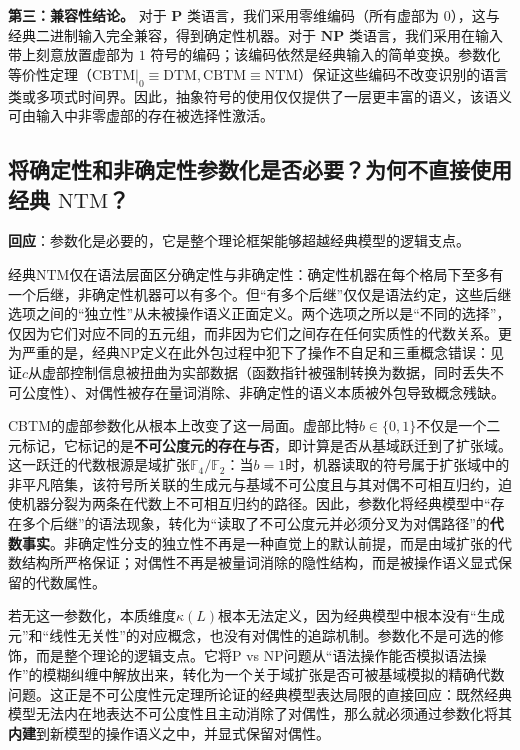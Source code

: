 \documentclass{ctexart}
\begin{document}
	\noindent\textbf{第三：兼容性结论。} 对于 $\mathbf{P}$ 类语言，我们采用零维编码（所有虚部为 $0$），这与经典二进制输入完全兼容，得到确定性机器。对于 $\mathbf{NP}$ 类语言，我们采用在输入带上刻意放置虚部为 $1$ 符号的编码；该编码依然是经典输入的简单变换。参数化等价性定理（$\text{CBTM}|_0 \equiv \text{DTM}, \text{CBTM} \equiv \text{NTM}$）保证这些编码不改变识别的语言类或多项式时间界。因此，抽象符号的使用仅仅提供了一层更丰富的语义，该语义可由输入中非零虚部的存在被选择性激活。
	
	
	\subsection{将确定性和非确定性参数化是否必要？为何不直接使用经典 $\mathrm{NTM}$？}
	
	\textbf{回应}：参数化是必要的，它是整个理论框架能够超越经典模型的逻辑支点。
	
	经典$\mathrm{NTM}$仅在语法层面区分确定性与非确定性：确定性机器在每个格局下至多有一个后继，非确定性机器可以有多个。但``有多个后继''仅仅是语法约定，这些后继选项之间的``独立性''从未被操作语义正面定义。两个选项之所以是``不同的选择''，仅因为它们对应不同的五元组，而非因为它们之间存在任何实质性的代数关系。更为严重的是，经典NP定义在此外包过程中犯下了操作不自足和三重概念错误：见证$c$从虚部控制信息被扭曲为实部数据（函数指针被强制转换为数据，同时丢失不可公度性）、对偶性被存在量词消除、非确定性的语义本质被外包导致概念残缺。
	
	CBTM的虚部参数化从根本上改变了这一局面。虚部比特$b\in\{0,1\}$不仅是一个二元标记，它标记的是\textbf{不可公度元的存在与否}，即计算是否从基域跃迁到了扩张域。这一跃迁的代数根源是域扩张$\mathbb{F}_4/\mathbb{F}_2$：当$b=1$时，机器读取的符号属于扩张域中的非平凡陪集，该符号所关联的生成元与基域不可公度且与其对偶不可相互归约，迫使机器分裂为两条在代数上不可相互归约的路径。因此，参数化将经典模型中``存在多个后继''的语法现象，转化为``读取了不可公度元并必须分叉为对偶路径''的\textbf{代数事实}。非确定性分支的独立性不再是一种直觉上的默认前提，而是由域扩张的代数结构所严格保证；对偶性不再是被量词消除的隐性结构，而是被操作语义显式保留的代数属性。
	
	若无这一参数化，本质维度$\kappa(L)$根本无法定义，因为经典模型中根本没有``生成元''和``线性无关性''的对应概念，也没有对偶性的追踪机制。参数化不是可选的修饰，而是整个理论的逻辑支点。它将P vs NP问题从``语法操作能否模拟语法操作''的模糊纠缠中解放出来，转化为一个关于域扩张是否可被基域模拟的精确代数问题。这正是不可公度性元定理\cite{philo2026,models2026}所论证的经典模型表达局限的直接回应：既然经典模型无法内在地表达不可公度性且主动消除了对偶性，那么就必须通过参数化将其\textbf{内建}到新模型的操作语义之中，并显式保留对偶性。
	
\end{document}
